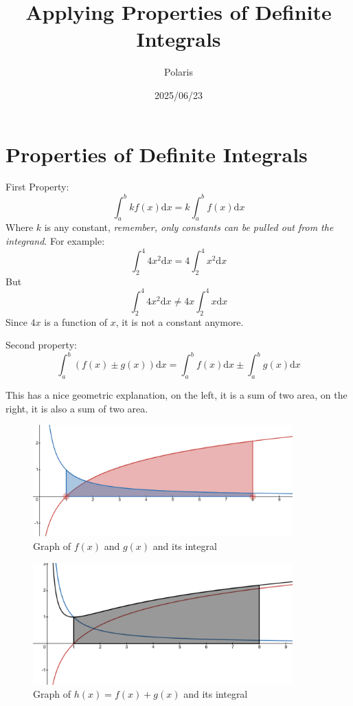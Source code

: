 \documentclass{article}
\title{Applying Properties of Definite Integrals}
\author{Polaris}
\date{2025/06/23}
\begin{document}
\maketitle

\section{Properties of Definite Integrals}
First Property:
\[
\int_{a}^{b} kf(x)\mathrm{ d}x = k\int_{a}^{b} f(x)\mathrm{ d}x
\]
Where $k$ is any constant, \emph{remember, only constants can be pulled out from the integrand}. For example:
\[
\int_{2}^{4} 4x^2 \mathrm{d}x = 4\int_{2}^{4}x^2 \mathrm{d}x
\]
But 
\[
\int_{2}^{4}4x^2 \mathrm{d}x \neq 4x\int_{2}^{4}x \mathrm{d}x
\]
Since $4x$ is a function of $x$, it is not a constant anymore.

Second property:
\[
\int_{a}^{b} \left(f(x) \pm g(x)\right) \mathrm{d}x = \int_{a}^{b} f(x) \mathrm{d}x \pm \int_{a}^{b} g(x) \mathrm{d}x
\]

This has a nice geometric explanation, on the left, it is a sum of two area, on the right, it is also a sum of two area.

\begin{figure}[H]
    \includegraphics[width = 10cm]{addition.png}
    \centering
    \caption{Graph of $f(x)$ and $g(x)$ and its integral}
\end{figure}

\begin{figure}[H]
    \includegraphics[width = 10cm]{addition2.png}
    \centering
    \caption{Graph of $h(x) = f(x) + g(x)$ and its integral}
\end{figure}
\end{document}
